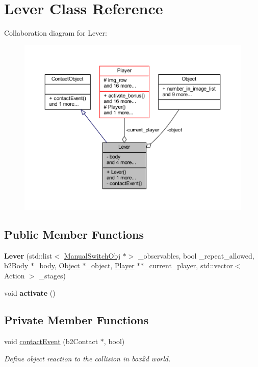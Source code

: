 \hypertarget{class_lever}{}\section{Lever Class Reference}
\label{class_lever}


Collaboration diagram for Lever\+:\nopagebreak
\begin{figure}[H]
\begin{center}
\leavevmode
\includegraphics[width=350pt]{class_lever__coll__graph}
\end{center}
\end{figure}
\subsection*{Public Member Functions}
\begin{DoxyCompactItemize}
\item 
\mbox{\label{class_lever_a2b4dd6cea65837c09711dda3d02d7cae}} 
{\bfseries Lever} (std\+::list$<$ \hyperlink{class_manual_switch_obj}{Manual\+Switch\+Obj} $\ast$$>$ \+\_\+observables, bool \+\_\+repeat\+\_\+allowed, b2\+Body $\ast$\+\_\+body, \hyperlink{class_object}{Object} $\ast$\+\_\+object, \hyperlink{class_player}{Player} $\ast$$\ast$\+\_\+current\+\_\+player, std\+::vector$<$ Action $>$ \+\_\+stages)
\item 
\mbox{\label{class_lever_a0aafb7fa0e219a59362cfdbdc30f6203}} 
void {\bfseries activate} ()
\end{DoxyCompactItemize}
\subsection*{Private Member Functions}
\begin{DoxyCompactItemize}
\item 
void \hyperlink{class_lever_a9ec153b4c960d0a187539cc8f07e5bd9}{contact\+Event} (b2\+Contact $\ast$, bool)
\begin{DoxyCompactList}\small\item\em Define object reaction to the collision in box2d world. \end{DoxyCompactList}\end{DoxyCompactItemize}

